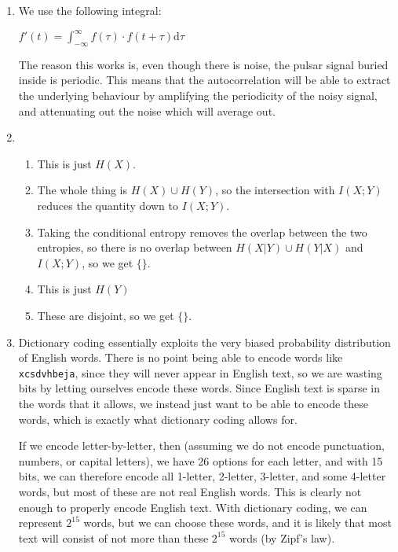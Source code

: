 


\begin{enumerate}[label=(\alph*)]
  \item


    We use the following integral:

    $f'(t) = \int_{-\infty}^\infty f(\tau) \cdot f(t + \tau) \mathrm{d}\tau$

    The reason this works is, even though there is noise, the pulsar signal buried inside is periodic. This means that the autocorrelation will be able to extract the underlying behaviour by amplifying the periodicity of the noisy signal, and attenuating out the noise which will average out.

  \item
    \begin{enumerate}[label=(\roman*)]
      \item
        This is just $H(X)$.

      \item
        The whole thing is $H(X) \cup H(Y)$, so the intersection with $I(X;Y)$ reduces the quantity down to $I(X;Y)$.

      \item
        Taking the conditional entropy removes the overlap between the two entropies, so there is no overlap between $H(X|Y) \cup H(Y|X)$ and $I(X;Y)$, so we get $\{\}$.

      \item
        This is just $H(Y)$

      \item
        These are disjoint, so we get $\{\}$.
        
    \end{enumerate}

  \item
    Dictionary coding essentially exploits the very biased probability distribution of English words. There is no point being able to encode words like \texttt{xcsdvhbeja}, since they will never appear in English text, so we are wasting bits by letting ourselves encode these words. Since English text is sparse in the words that it allows, we instead just want to be able to encode these words, which is exactly what dictionary coding allows for.

    If we encode letter-by-letter, then (assuming we do not encode punctuation, numbers, or capital letters), we have 26 options for each letter, and with 15 bits, we can therefore encode all 1-letter, 2-letter, 3-letter, and some 4-letter words, but most of these are not real English words. This is clearly not enough to properly encode English text. With dictionary coding, we can represent $2^15$ words, but we can choose these words, and it is likely that most text will consist of not more than these $2^15$ words (by Zipf's law).


\end{enumerate}
